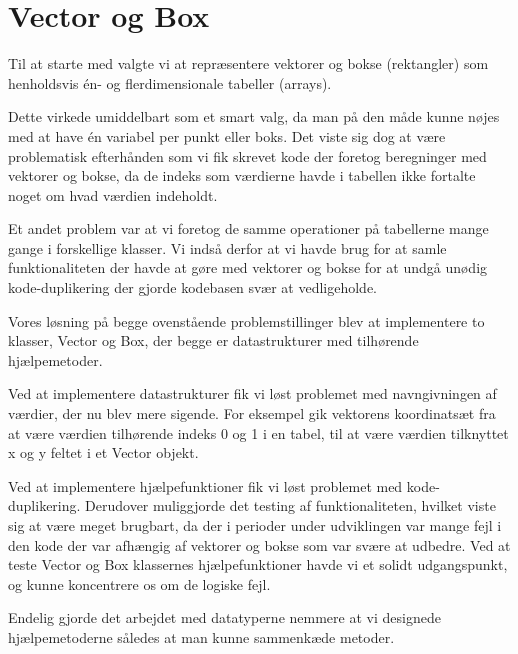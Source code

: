 \section{Vector og Box}

Til at starte med valgte vi at repræsentere vektorer og bokse (rektangler) som henholdsvis én- og flerdimensionale tabeller (arrays).

Dette virkede umiddelbart som et smart valg, da man på den måde kunne nøjes med at have én variabel per punkt eller boks. Det viste sig dog at være problematisk efterhånden som vi fik skrevet kode der foretog beregninger med vektorer og bokse, da de indeks som værdierne havde i tabellen ikke fortalte noget om hvad værdien indeholdt.

Et andet problem var at vi foretog de samme operationer på tabellerne mange gange i forskellige klasser. Vi indså derfor at vi havde brug for at samle funktionaliteten der havde at gøre med vektorer og bokse for at undgå unødig kode-duplikering der gjorde kodebasen svær at vedligeholde.

Vores løsning på begge ovenstående problemstillinger blev at implementere to klasser, Vector og Box, der begge er datastrukturer med tilhørende hjælpemetoder.

Ved at implementere datastrukturer fik vi løst problemet med navngivningen af værdier, der nu blev mere sigende. For eksempel gik vektorens koordinatsæt fra at være værdien tilhørende indeks 0 og 1 i en tabel, til at være værdien tilknyttet x og y feltet i et Vector objekt.

Ved at implementere hjælpefunktioner fik vi løst problemet med kode-duplikering. Derudover muliggjorde det testing af funktionaliteten, hvilket viste sig at være meget brugbart, da der i perioder under udviklingen var mange fejl i den kode der var afhængig af vektorer og bokse som var svære at udbedre. Ved at teste Vector og Box klassernes hjælpefunktioner havde vi et solidt udgangspunkt, og kunne koncentrere os om de logiske fejl.

Endelig gjorde det arbejdet med datatyperne nemmere at vi designede hjælpemetoderne således at man kunne sammenkæde metoder.